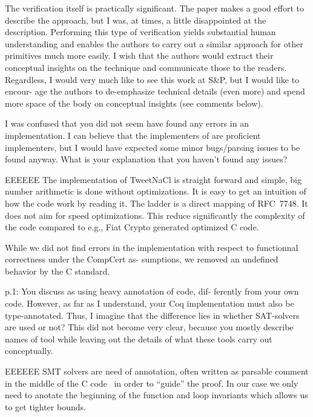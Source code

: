 The verification itself is practically significant. The paper
makes a good effort to describe the approach, but I was, at
times, a little disappointed at the description. Performing this
type of verification yields substantial human understanding
and enables the authors to carry out a similar approach for
other primitives much more easily. I wish that the authors
would extract their conceptual insights on the technique and
communicate those to the readers. Regardless, I would very
much like to see this work at S\&P, but I would like to encour-
age the authors to de-emphasize technical details (even more)
and spend more space of the body on conceptual insights (see
comments below).


\begin{center}
\end{center}

I was confused that you did not seem have found any errors
in an implementation. I can believe that the implementers
of \cite{BGJ+15} are proficient implementers, but I would have expected
some minor bugs/parsing issues to be found anyway. What is
your explanation that you haven’t found any issues?

\begin{answer}{EEEEEE}
The implementation of TweetNaCl is straight forward and
simple, big number arithmetic is done without optimizations.
It is easy to get an intuition of how the code work by reading
it. The ladder is a direct mapping of RFC~7748. It does
not aim for speed optimizations. This reduce significantly
the complexity of the code compared to e.g., Fiat Crypto
generated optimized C code.

While we did not find errors in the implementation with
respect to functionnal correctness under the CompCert as-
sumptions, we removed an undefined behavior by the C
standard.
\end{answer}

p.1: You discuss \cite{Ber06} as using heavy annotation of code, dif-
ferently from your own code. However, as far as I understand,
your Coq implementation must also be type-annotated. Thus,
I imagine that the difference lies in whether SAT-solvers are
used or not? This did not become very clear, because you
mostly describe names of tool while leaving out the details of
what these tools carry out conceptually.

\begin{answer}{EEEEEE}
SMT solvers are need of annotation, often written as
parsable comment in the middle of the C code~\cite{acsl} in order to
``guide'' the proof. In our case we only need to anotate the
beginning of the function and loop invariants which allows
us to get tighter bounds.
\end{answer}

